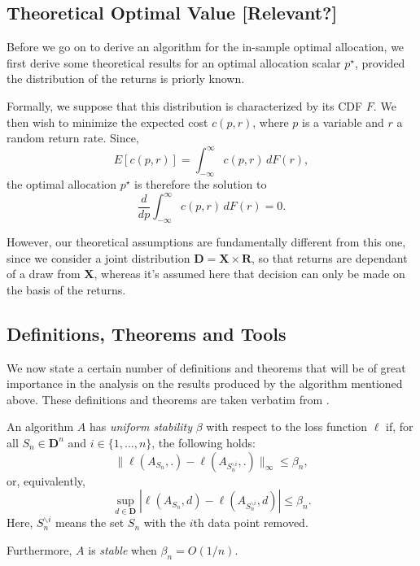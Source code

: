 \subsection{Theoretical Optimal Value [Relevant?]}

Before we go on to derive an algorithm for the in-sample optimal allocation, we first
derive some theoretical results for an optimal allocation scalar $p^\star$, provided the
distribution of the returns is priorly known. 

Formally, we suppose that this distribution is characterized by its CDF $F$. We then wish
to minimize the expected cost $c(p,r)$, where $p$ is a variable and $r$ a random return
rate. Since,
\begin{equation*}
  E[c(p,r)] = \int_{-\infty}^{\infty} c(p,r)\,dF(r),
\end{equation*}
the optimal allocation $p^\star$ is therefore the solution to
\begin{equation*}
  \frac{d}{dp} \int_{-\infty}^{\infty} c(p,r)\,dF(r) = 0.
\end{equation*}

However, our theoretical assumptions are fundamentally different from this one, since we
consider a joint distribution $\bm D= \bm X \times \bm R$, so that returns are dependant
of a draw from $\bm X$, whereas it's assumed here that decision can only be made on the
basis of the returns. 

\subsection{Definitions, Theorems and Tools}
We now state a certain number of definitions and theorems that will be of great importance
in the analysis on the results produced by the algorithm mentioned above. These
definitions and theorems are taken verbatim from \cite{bousquet2002}.

\begin{deff}
  An algorithm $A$ has \textit{uniform stability} $\beta$ with respect to the loss
  function $\ell$ if, for all $S_n\in\bm D^n$ and $i\in\{1,\ldots,n\}$, the following
  holds:
  \begin{equation*}
    \|\ell(A_{S_n},.) - \ell(A_{S^{\backslash i}_n},.)\|_{\infty} \leq \beta_n,
  \end{equation*}
  or, equivalently,
  \begin{equation*}
    \sup_{d\in\bm D}|\ell(A_{S_n},d) - \ell(A_{S^{\backslash i}_n},d)| \leq \beta_n.
  \end{equation*}
  Here, $S^{\backslash i}_n$ means the set $S_n$ with the $i$th data point removed.

  Furthermore, $A$ is \textit{stable} when $\beta_n = O(1/n)$.
\end{deff}

